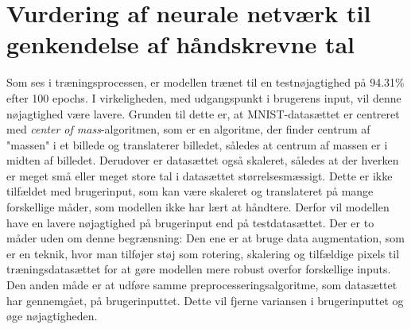 \documentclass{article}
\begin{document}
\section{Vurdering af neurale netværk til genkendelse af håndskrevne tal}
Som ses i træningsprocessen, er modellen trænet til en testnøjagtighed på 94.31\% efter 100 epochs. I virkeligheden, med udgangspunkt i brugerens input, vil denne nøjagtighed være lavere. Grunden til dette er, at MNIST-datasættet er centreret med \textit{center of mass}-algoritmen, som er en algoritme, der finder centrum af "massen" i et billede og translaterer billedet, således at centrum af massen er i midten af billedet. Derudover er datasættet også skaleret, således at der hverken er meget små eller meget store tal i datasættet størrelsesmæssigt. Dette er ikke tilfældet med brugerinput, som kan være skaleret og translateret på mange forskellige måder, som modellen ikke har lært at håndtere. Derfor vil modellen have en lavere nøjagtighed på brugerinput end på testdatasættet. Der er to måder uden om denne begrænsning: Den ene er at bruge data augmentation, som er en teknik, hvor man tilføjer støj som rotering, skalering og tilfældige pixels til træningsdatasættet for at gøre modellen mere robust overfor forskellige inputs. Den anden måde er at udføre samme preprocesseringsalgoritme, som datasættet har gennemgået, på brugerinputtet. Dette vil fjerne variansen i brugerinputtet og øge nøjagtigheden.\\\\
\end{document}
